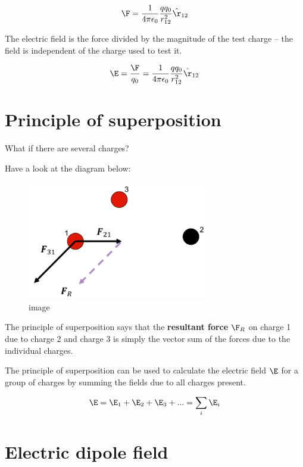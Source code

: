 \documentclass[
]{book}
\begin{document}
\[\begin{aligned}
\F = \frac{1}{4\pi \epsilon_0} \frac{q q_0}{r_{12}^2} \hat{\r}_{12}
\end{aligned}\]

The electric field is the force divided by the magnitude of the test
charge -- the field is independent of the charge used to test it.

\[\begin{aligned}
\E = \frac{\F}{q_0} = \frac{1}{4\pi \epsilon_0} \frac{q q_0}{r_{12}^2} \hat{\r}_{12}
\end{aligned}\]

\hypertarget{principle-of-superposition}{%
\section{Principle of superposition}\label{principle-of-superposition}}

What if there are several charges?

Have a look at the diagram below:

\begin{figure}
\centering
\includegraphics[width=80mm,height=\textheight]{Figures/superposition.png}
\caption{image}
\end{figure}

The principle of superposition says that the \textbf{resultant force} \(\F_R\)
on charge 1 due to charge 2 and charge 3 is simply the vector sum of the
forces due to the individual charges.

The principle of superposition can be used to calculate the electric
field \(\E\) for a group of charges by summing the fields due to all
charges present.

\[\begin{aligned}
\E = \E_1 + \E_2 + \E_3 + ... = \sum_i \E_i
\end{aligned}\]

\hypertarget{electric-dipole-field}{%
\section{Electric dipole field}\label{electric-dipole-field}}
\end{document}
